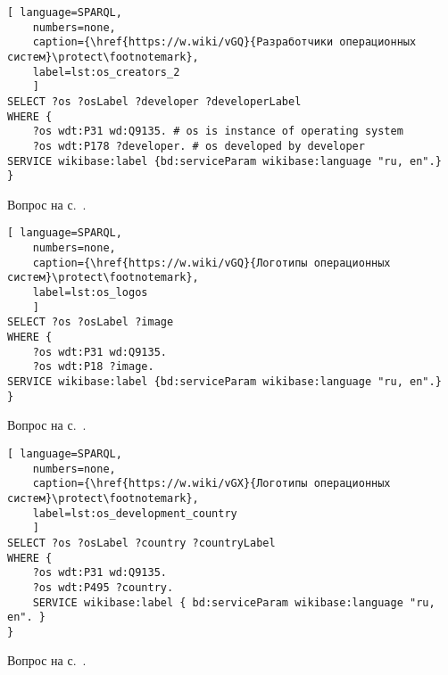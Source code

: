 \begin{task}
	\label{answer:os_and_developers}

\begin{lstlisting}[ language=SPARQL, 
    numbers=none,
    caption={\href{https://w.wiki/vGQ}{Разработчики операционных систем}\protect\footnotemark},
    label=lst:os_creators_2
	]
SELECT ?os ?osLabel ?developer ?developerLabel
WHERE {
	?os wdt:P31 wd:Q9135. # os is instance of operating system
	?os wdt:P178 ?developer. # os developed by developer
SERVICE wikibase:label {bd:serviceParam wikibase:language "ru, en".}
}\end{lstlisting}

\small{Вопрос на с.~\pageref{tasks:operating_system_tasks}.}
\end{task}

\begin{task}
\label{answer:os_and_logos}

\begin{lstlisting}[ language=SPARQL, 
    numbers=none,
    caption={\href{https://w.wiki/vGQ}{Логотипы операционных систем}\protect\footnotemark},
    label=lst:os_logos
	]
SELECT ?os ?osLabel ?image
WHERE {
	?os wdt:P31 wd:Q9135.
	?os wdt:P18 ?image.
SERVICE wikibase:label {bd:serviceParam wikibase:language "ru, en".}
}\end{lstlisting}

\small{Вопрос на с.~\pageref{tasks:operating_system_tasks}.}
\end{task}

\begin{task}
\label{answer:os_country}

\begin{lstlisting}[ language=SPARQL, 
    numbers=none,
    caption={\href{https://w.wiki/vGX}{Логотипы операционных систем}\protect\footnotemark},
	label=lst:os_development_country
	]
SELECT ?os ?osLabel ?country ?countryLabel
WHERE {
	?os wdt:P31 wd:Q9135.
	?os wdt:P495 ?country.
	SERVICE wikibase:label { bd:serviceParam wikibase:language "ru, en". }
}\end{lstlisting}

\small{Вопрос на с.~\pageref{tasks:operating_system_tasks}.}
\end{task}

